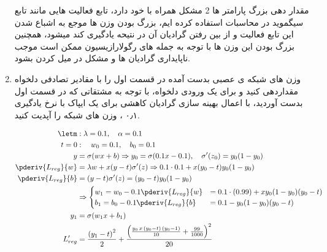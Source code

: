 \begin{enumerate}
{	      \begin{qsolve}[]
		      مقدار دهی بزرگ پارامتر ها 2 مشکل همراه با خود دارد، تابع فعالیت هایی مانند تابع سیگموید در محاسبات استفاده کرده ایم،
		      بزرگ بودن وزن ها موجع به اشباع شدن این تابع فعالیت و از بین رفتن گرادیان آن در نتیحه یادگیری کند میشود،
		      همچنین بزرگ بودن این وزن ها با توجه به جمله های رگولارازیسیون ممکن است موجب ناپایداری گرادیان ها و مشکل در میل کردن بشود.
	      \end{qsolve}
	      }

	\item {
	      وزن های شبکه ی عصبی بدست آمده در قسمت اول را با مقادیر تصادفی دلخواه مقداردهی کنید و برای
	      یک ورودی دلخواه، با توجه به مشتقاتی که در قسمت اول بدست آوردید، با اعمال بهینه سازی گرادیان
	      کاهشی برای یک ایپاک با نرخ یادگیری ۰٫۱ ، وزن های شبکه را آپدیت کنید.

	      \begin{qsolve}[]
		      \begin{align*}
			      \letm               & : \lambda = 0.1,\quad \alpha = 0.1                                               \\
			      t  =0               & :\quad w_0 = 0.1,\quad b_0 = 0.1                                                 \\
			      y                   & = \sigma(wx+b) \Rightarrow y_0 = \sigma(0.1x-0.1),\quad\sigma'(z_0) = y_0(1-y_0) \\
			      \pderiv{L_{reg}}{w} & =\lambda w + x(y-t)\sigma'(z) \Rightarrow  0.1\cdot0.1+x(y_0-t)y_0(1-y_0)        \\
			      \pderiv{L_{reg}}{b} & =(y-t)\sigma'(z) = (y_0-t)y_0(1-y_0)                                             \\
			                          & \Rightarrow
			      \begin{cases}
				      w_1 = w_0 - 0.1 \pderiv{L_{reg}}{w} & = 0.1\cdot(0.99) + xy_0(1-y_0)(y_0-t) \\
				      b_1 = b_0 - 0.1 \pderiv{L_{reg}}{b} & = 0.1 - y_0(1-y_0)(y_0-t)
			      \end{cases}     \\
			      y_1                 & = \sigma(w_1x+b_1)                                                               \\
			      L'_{reg}            & =
			      \frac{{\left(y_1-t\right)}^2}{2}+\frac{{\left(\frac{y_0\,x\,\left(y_0-t\right)\,\left(y_0-1\right)}{10}+\frac{99}{1000}\right)}^2}{20}
		      \end{align*}
	      \end{qsolve}
	      }
\end{enumerate}

